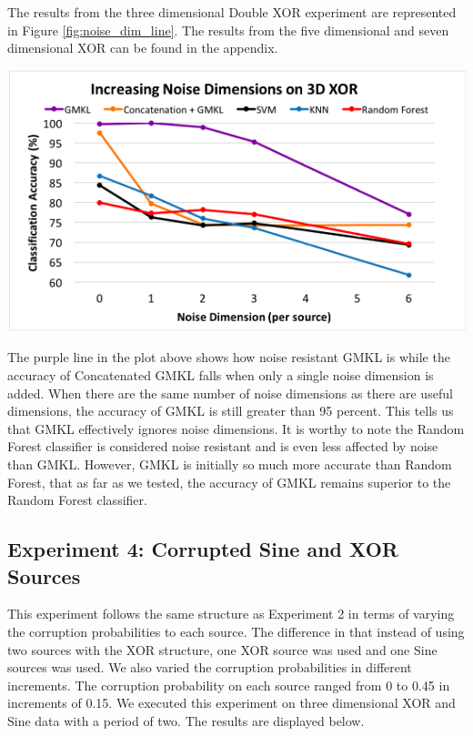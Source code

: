 \documentclass{article}
\begin{document}
The results from the three dimensional Double XOR experiment are represented in Figure \ref{fig:noise_dim_line}. The results from the five dimensional and seven dimensional XOR can be found in the appendix.

\begin{minipage}{\textwidth}
    \centering
    \includegraphics[scale=0.7]{Noise_Dim_line.png}
    \label{fig:noise_dim_line}
\end{minipage}

The purple line in the plot above shows how noise resistant GMKL is while the accuracy of Concatenated GMKL falls when only a single noise dimension is added. When there are the same number of noise dimensions as there are useful dimensions, the accuracy of GMKL is still greater than 95 percent. This tells us that GMKL effectively ignores noise dimensions. It is worthy to note the Random Forest classifier is considered noise resistant and is even less affected by noise than GMKL. However, GMKL is initially so much more accurate than Random Forest, that as far as we tested, the accuracy of GMKL remains superior to the Random Forest classifier.



\subsection*{Experiment 4: Corrupted Sine and XOR Sources}

This experiment follows the same structure as Experiment 2 in terms of varying the corruption probabilities to each source. The difference in that instead of using two sources with the XOR structure, one XOR source was used and one Sine sources was used. We also varied the corruption probabilities in different increments. The corruption probability on each source ranged from 0 to 0.45 in increments of 0.15. We executed this experiment on three dimensional XOR and Sine data with a period of two. The results are displayed below.
\end{document}
